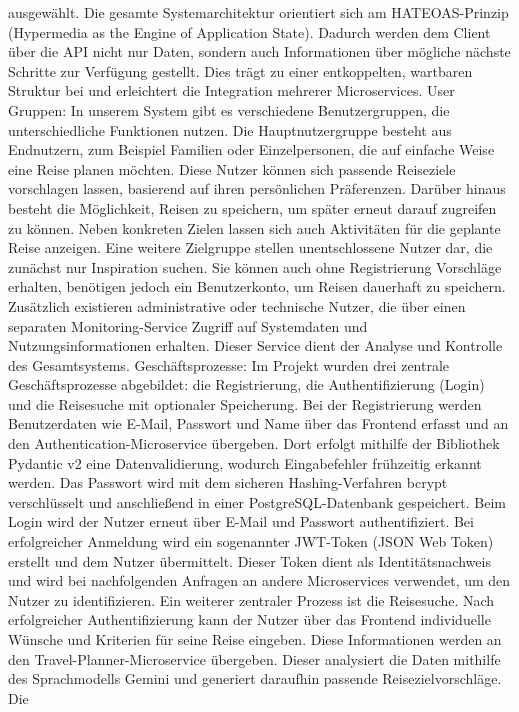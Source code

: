 ausgewählt.
Die gesamte Systemarchitektur orientiert sich am HATEOAS-Prinzip (Hypermedia as the Engine of
Application State). Dadurch werden dem Client über die API nicht nur Daten, sondern auch
Informationen über mögliche nächste Schritte zur Verfügung gestellt. Dies trägt zu einer
entkoppelten, wartbaren Struktur bei und erleichtert die Integration mehrerer Microservices.
User Gruppen:
In unserem System gibt es verschiedene Benutzergruppen, die unterschiedliche Funktionen nutzen.
Die Hauptnutzergruppe besteht aus Endnutzern, zum Beispiel Familien oder Einzelpersonen, die
auf einfache Weise eine Reise planen möchten. Diese Nutzer können sich passende Reiseziele
vorschlagen lassen, basierend auf ihren persönlichen Präferenzen. Darüber hinaus besteht die
Möglichkeit, Reisen zu speichern, um später erneut darauf zugreifen zu können. Neben konkreten
Zielen lassen sich auch Aktivitäten für die geplante Reise anzeigen. Eine weitere Zielgruppe stellen
unentschlossene Nutzer dar, die zunächst nur Inspiration suchen. Sie können auch ohne
Registrierung Vorschläge erhalten, benötigen jedoch ein Benutzerkonto, um Reisen dauerhaft zu
speichern. Zusätzlich existieren administrative oder technische Nutzer, die über einen separaten
Monitoring-Service Zugriff auf Systemdaten und Nutzungsinformationen erhalten. Dieser Service
dient der Analyse und Kontrolle des Gesamtsystems.
Geschäftsprozesse:
Im Projekt wurden drei zentrale Geschäftsprozesse abgebildet: die Registrierung, die
Authentifizierung (Login) und die Reisesuche mit optionaler Speicherung. Bei der Registrierung
werden Benutzerdaten wie E-Mail, Passwort und Name über das Frontend erfasst und an den
Authentication-Microservice übergeben. Dort erfolgt mithilfe der Bibliothek Pydantic v2 eine
Datenvalidierung, wodurch Eingabefehler frühzeitig erkannt werden. Das Passwort wird mit dem
sicheren Hashing-Verfahren bcrypt verschlüsselt und anschließend in einer PostgreSQL-Datenbank
gespeichert. Beim Login wird der Nutzer erneut über E-Mail und Passwort authentifiziert. Bei
erfolgreicher Anmeldung wird ein sogenannter JWT-Token (JSON Web Token) erstellt und dem
Nutzer übermittelt. Dieser Token dient als Identitätsnachweis und wird bei nachfolgenden Anfragen
an andere Microservices verwendet, um den Nutzer zu identifizieren.
Ein weiterer zentraler Prozess ist die Reisesuche. Nach erfolgreicher Authentifizierung kann der
Nutzer über das Frontend individuelle Wünsche und Kriterien für seine Reise eingeben. Diese
Informationen werden an den Travel-Planner-Microservice übergeben. Dieser analysiert die Daten
mithilfe des Sprachmodells Gemini und generiert daraufhin passende Reisezielvorschläge. Die
